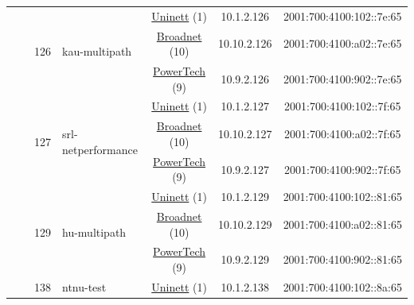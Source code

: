 \begin{small}
\begin{center}
\begin{longtable}{|c|c|c|c|c|c|c|c|}
  &  & \multirow{3}{*}{\tiny{126}} & \multicolumn{1}{|l|}{\multirow{3}{*}{\tiny{kau-multipath}}} & \multicolumn{2}{|c|}{\tiny{\href{https://www.uninett.no}{Uninett} (1)}} & \tiny{10.1.2.126} & \tiny{2001:700:4100:102::7e:65} \\* \cline{5-5}\cline{6-6}\cline{7-7}\cline{8-8}
  &  &  &  & \multicolumn{2}{|c|}{\tiny{\href{https://www.broadnet.no}{Broadnet} (10)}} & \tiny{10.10.2.126} & \tiny{2001:700:4100:a02::7e:65} \\* \cline{5-5}\cline{6-6}\cline{7-7}\cline{8-8}
  &  &  &  & \multicolumn{2}{|c|}{\tiny{\href{http://www.powertech.no}{PowerTech} (9)}} & \tiny{10.9.2.126} & \tiny{2001:700:4100:902::7e:65} \\* \cline{3-3}\cline{4-4}\cline{5-5}\cline{6-6}\cline{7-7}\cline{8-8}
  &  & \multirow{3}{*}{\tiny{127}} & \multicolumn{1}{|l|}{\multirow{3}{*}{\tiny{srl-netperformance}}} & \multicolumn{2}{|c|}{\tiny{\href{https://www.uninett.no}{Uninett} (1)}} & \tiny{10.1.2.127} & \tiny{2001:700:4100:102::7f:65} \\* \cline{5-5}\cline{6-6}\cline{7-7}\cline{8-8}
  &  &  &  & \multicolumn{2}{|c|}{\tiny{\href{https://www.broadnet.no}{Broadnet} (10)}} & \tiny{10.10.2.127} & \tiny{2001:700:4100:a02::7f:65} \\* \cline{5-5}\cline{6-6}\cline{7-7}\cline{8-8}
  &  &  &  & \multicolumn{2}{|c|}{\tiny{\href{http://www.powertech.no}{PowerTech} (9)}} & \tiny{10.9.2.127} & \tiny{2001:700:4100:902::7f:65} \\* \cline{3-3}\cline{4-4}\cline{5-5}\cline{6-6}\cline{7-7}\cline{8-8}
  &  & \multirow{3}{*}{\tiny{129}} & \multicolumn{1}{|l|}{\multirow{3}{*}{\tiny{hu-multipath}}} & \multicolumn{2}{|c|}{\tiny{\href{https://www.uninett.no}{Uninett} (1)}} & \tiny{10.1.2.129} & \tiny{2001:700:4100:102::81:65} \\* \cline{5-5}\cline{6-6}\cline{7-7}\cline{8-8}
  &  &  &  & \multicolumn{2}{|c|}{\tiny{\href{https://www.broadnet.no}{Broadnet} (10)}} & \tiny{10.10.2.129} & \tiny{2001:700:4100:a02::81:65} \\* \cline{5-5}\cline{6-6}\cline{7-7}\cline{8-8}
  &  &  &  & \multicolumn{2}{|c|}{\tiny{\href{http://www.powertech.no}{PowerTech} (9)}} & \tiny{10.9.2.129} & \tiny{2001:700:4100:902::81:65} \\* \cline{3-3}\cline{4-4}\cline{5-5}\cline{6-6}\cline{7-7}\cline{8-8}
  &  & \multirow{3}{*}{\tiny{138}} & \multicolumn{1}{|l|}{\multirow{3}{*}{\tiny{ntnu-test}}} & \multicolumn{2}{|c|}{\tiny{\href{https://www.uninett.no}{Uninett} (1)}} & \tiny{10.1.2.138} & \tiny{2001:700:4100:102::8a:65} \\* \cline{5-5}\cline{6-6}\cline{7-7}\cline{8-8}

\end{longtable}
\end{center}
\end{small}
